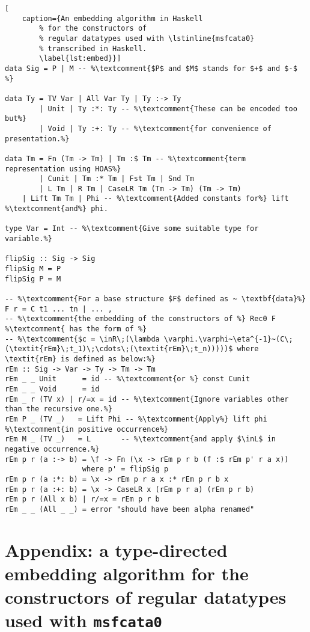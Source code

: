 \vspace*{7.5ex}
\begin{lstlisting}[
	caption={An embedding algorithm in Haskell
		% for the constructors of
		% regular datatypes used with \lstinline{msfcata0}
		% transcribed in Haskell.
		\label{lst:embed}}]
data Sig = P | M -- %\textcomment{$P$ and $M$ stands for $+$ and $-$ %}

data Ty = TV Var | All Var Ty | Ty :-> Ty
        | Unit | Ty :*: Ty -- %\textcomment{These can be encoded too but%}
        | Void | Ty :+: Ty -- %\textcomment{for convenience of presentation.%}
        
data Tm = Fn (Tm -> Tm) | Tm :$ Tm -- %\textcomment{term representation using HOAS%}
        | Cunit | Tm :* Tm | Fst Tm | Snd Tm
        | L Tm | R Tm | CaseLR Tm (Tm -> Tm) (Tm -> Tm)
	| Lift Tm Tm | Phi -- %\textcomment{Added constants for%} lift %\textcomment{and%} phi.

type Var = Int -- %\textcomment{Give some suitable type for variable.%}

flipSig :: Sig -> Sig
flipSig M = P
flipSig P = M

-- %\textcomment{For a base structure $F$ defined as ~ \textbf{data}%} F r = C t1 ... tn | ... ,
-- %\textcomment{the embedding of the constructors of %} Rec0 F %\textcomment{ has the form of %}
-- %\textcomment{$c = \inR\;(\lambda \varphi.\varphi~\eta^{-1}~(C\;(\textit{rEm}\;t_1)\;\cdots\;(\textit{rEm}\;t_n)))))$ where \textit{rEm} is defined as below:%}
rEm :: Sig -> Var -> Ty -> Tm -> Tm
rEm _ _ Unit      = id -- %\textcomment{or %} const Cunit
rEm _ _ Void      = id
rEm _ r (TV x) | r/=x = id -- %\textcomment{Ignore variables other than the recursive one.%}
rEm P _ (TV _)   = Lift Phi -- %\textcomment{Apply%} lift phi %\textcomment{in positive occurrence%}
rEm M _ (TV _)   = L       -- %\textcomment{and apply $\inL$ in negative occurrence.%}
rEm p r (a :-> b) = \f -> Fn (\x -> rEm p r b (f :$ rEm p' r a x))
                  where p' = flipSig p
rEm p r (a :*: b) = \x -> rEm p r a x :* rEm p r b x
rEm p r (a :+: b) = \x -> CaseLR x (rEm p r a) (rEm p r b)
rEm p r (All x b) | r/=x = rEm p r b
rEm _ _ (All _ _) = error "should have been alpha renamed"
\end{lstlisting}

\newpage
\appendix
\section{Appendix:
	a type-directed embedding algorithm for the constructors of
	regular datatypes used with \lstinline{msfcata0}} \label{sec:appendix}

